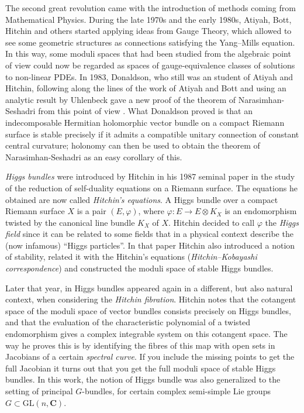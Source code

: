 \documentclass[12pt,a4paper]{book}
\theoremstyle{definition} \newtheorem{defn}[thm]{Definition}
\theoremstyle{definition} \newtheorem{ejemplo}[thm]{Example}
\theoremstyle{remark} \newtheorem{rem}[thm]{Remark}
\def\CC{\mathbf{C}}
\begin{document}
The second great revolution came with the introduction of methods coming from Mathematical Physics. During the late 1970s and the early 1980s, Atiyah, Bott, Hitchin and others started applying ideas from Gauge Theory, which allowed to see some geometric structures as connections satisfying the Yang--Mills equation. In this way, some moduli spaces that had been studied from the algebraic point of view could now be regarded as spaces of gauge-equivalence classes of solutions to non-linear  PDEs. In 1983, Donaldson, who still was an student of Atiyah and Hitchin, following along the lines of the work of Atiyah and Bott \cite{atiyahbott} and using an analytic result by Uhlenbeck \cite{uhlenbeck} gave a new proof of the theorem of Narasimhan-Seshadri from this point of view \cite{donaldson}. What Donaldson proved is that an indecomposable Hermitian holomorphic vector bundle on a compact Riemann surface is stable precisely if it admits a compatible unitary connection of constant central curvature; holonomy can then be used to obtain the theorem of Narasimhan-Seshadri as an easy corollary of this.

\textit{Higgs bundles} were introduced by Hitchin in his 1987 seminal paper \cite{hitchinselfduality} in the study of the reduction of self-duality equations on a Riemann surface. The equations he obtained are now called \textit{Hitchin's equations}. A Higgs bundle over a compact Riemann surface $X$ is a pair $(E,\varphi)$, where $\varphi:E \rightarrow E \otimes K_X$ is an endomorphism twisted by the canonical line bundle $K_X$ of $X$. Hitchin decided to call $\varphi$ the \textit{Higgs field} since it can be related to some fields that in a physical context describe the (now infamous) ``Higgs particles''. In that paper Hitchin also introduced a notion of stability, related it with the Hitchin's equations (\textit{Hitchin--Kobayashi correspondence}) and constructed the moduli space of stable Higgs bundles. 

Later that year, in \cite{hitchinsystem} Higgs bundles appeared again in a different, but also natural context, when considering the \textit{Hitchin fibration}. Hitchin notes that the cotangent space of the moduli space of vector bundles consists precisely on Higgs bundles, and that the evaluation of the characteristic polynomial of a twisted endomorphism gives a complex integrable system on this cotangent space. The way he proves this is by identifying the fibres of this map with open sets in Jacobians of a certain \textit{spectral curve}. If you include the missing points to get the full Jacobian it turns out that you get the full moduli space of stable Higgs bundles. In this work, the notion of Higgs bundle was also generalized to the setting of principal $G$-bundles, for certain complex semi-simple Lie groups $G \subset \mathrm{GL}(n,\CC)$.
\end{document}
